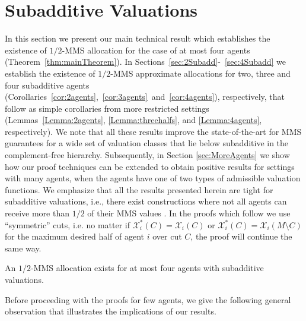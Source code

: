 \section{Subadditive Valuations}
\label{sec:SubaddVal}

In this section we present our main technical result which establishes the existence of $1/2$-MMS allocation for the case of at most four agents (Theorem~\ref{thm:mainTheorem}). In Sections~\ref{sec:2Subadd}-~\ref{sec:4Subadd} we establish the existence of $1/2$-MMS approximate allocations for two, three and four subadditive agents (Corollaries~\ref{cor:2agents},~\ref{cor:3agents}~and~\ref{cor:4agents}), respectively, that follow as simple corollaries from more restricted settings (Lemmas~\ref{Lemma:2agents}, \ref{Lemma:threehalfs}, and \ref{Lemma:4agents}, respectively). We note that all these results improve the state-of-the-art for MMS guarantees for a wide set of valuation classes that lie below subadditive in the complement-free hierarchy. Subsequently, in Section \ref{sec:MoreAgents} we show how our proof techniques can be extended to obtain positive results for settings with many agents, when the agents have one of two types of admissible valuation functions. We emphasize that all the results presented herein are tight for subadditive valuations, i.e., there exist constructions where not all agents can receive more than $1/2$ of their MMS values \cite{GhodsiHSSY22}. In the proofs which follow we use ``symmetric'' cuts, i.e. no matter if $\mathcal{X}^*_i(C)=\mathcal{X}_i(C)$ or $\mathcal{X}^*_i(C)=\mathcal{X}_i(M \setminus C)$ for the maximum desired half of agent $i$ over cut $C$, the proof will continue the same way. 


\begin{theorem}
\label{thm:mainTheorem}
    An $1/2$-MMS allocation exists for at most four agents with subadditive valuations.
\end{theorem}

Before proceeding with the proofs for few agents, we give the following general observation that illustrates the implications of our results. 


